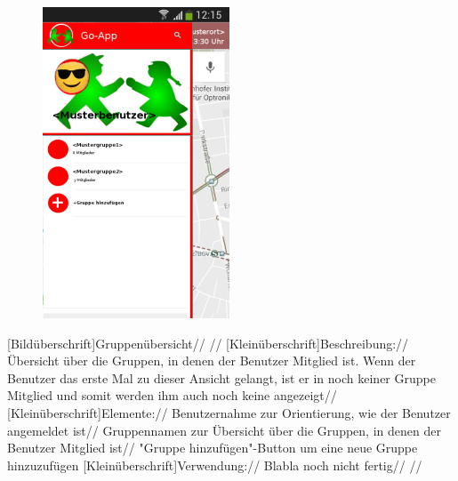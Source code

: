 \begin{figure}
	\includegraphics[scale =1]{resources/images/gruppenuebersicht.png}
\end{figure}
[Bildüberschrift]Gruppenübersicht// //
[Kleinüberschrift]Beschreibung://
Übersicht über die Gruppen, in denen der Benutzer Mitglied ist. Wenn der Benutzer das erste Mal zu dieser Ansicht gelangt, ist er in noch keiner Gruppe Mitglied und somit werden ihm auch noch keine angezeigt//
[Kleinüberschrift]Elemente://
Benutzernahme zur Orientierung, wie der Benutzer angemeldet ist//
Gruppennamen zur Übersicht über die Gruppen, in denen der Benutzer Mitglied ist//
"Gruppe hinzufügen"-Button um eine neue Gruppe hinzuzufügen
[Kleinüberschrift]Verwendung://
Blabla noch nicht fertig// //

